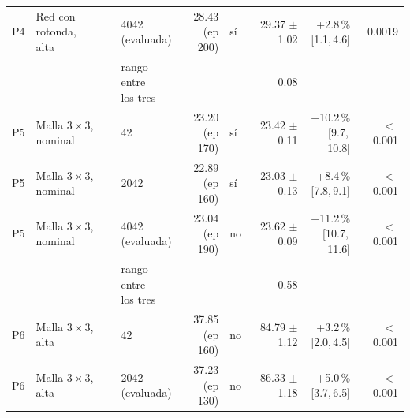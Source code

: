 \begin{table}[H]
\begin{tabular}{lllrlrrr}
P4 & \makecell[l]{Red con rotonda,\\{}alta} & \makecell[l]{4042\\{}(evaluada)} & \makecell[r]{28.43\\{}(ep 200)} & sí & \makecell[r]{29.37\\{}$\pm$ 1.02} & \makecell[r]{+2.8\,\%\\{}[1.1,\,4.6]} & 0.0019 \\
 & & \makecell[l]{rango entre\\{}los tres} & & & 0.08 & & \\
P5 & \makecell[l]{Malla $3 \times 3$,\\{}nominal} & 42 & \makecell[r]{23.20\\{}(ep 170)} & sí & \makecell[r]{23.42\\{}$\pm$ 0.11} & \makecell[r]{+10.2\,\%\\{}[9.7,\,10.8]} & $<$\,0.001 \\
P5 & \makecell[l]{Malla $3 \times 3$,\\{}nominal} & 2042 & \makecell[r]{22.89\\{}(ep 160)} & sí & \makecell[r]{23.03\\{}$\pm$ 0.13} & \makecell[r]{+8.4\,\%\\{}[7.8,\,9.1]} & $<$\,0.001 \\
P5 & \makecell[l]{Malla $3 \times 3$,\\{}nominal} & \makecell[l]{4042\\{}(evaluada)} & \makecell[r]{23.04\\{}(ep 190)} & no & \makecell[r]{23.62\\{}$\pm$ 0.09} & \makecell[r]{+11.2\,\%\\{}[10.7,\,11.6]} & $<$\,0.001 \\
 & & \makecell[l]{rango entre\\{}los tres} & & & 0.58 & & \\
P6 & \makecell[l]{Malla $3 \times 3$,\\{}alta} & 42 & \makecell[r]{37.85\\{}(ep 160)} & no & \makecell[r]{84.79\\{}$\pm$ 1.12} & \makecell[r]{+3.2\,\%\\{}[2.0,\,4.5]} & $<$\,0.001 \\
P6 & \makecell[l]{Malla $3 \times 3$,\\{}alta} & \makecell[l]{2042\\{}(evaluada)} & \makecell[r]{37.23\\{}(ep 130)} & no & \makecell[r]{86.33\\{}$\pm$ 1.18} & \makecell[r]{+5.0\,\%\\{}[3.7,\,6.5]} & $<$\,0.001 \\

\end{tabular}
\end{table}
